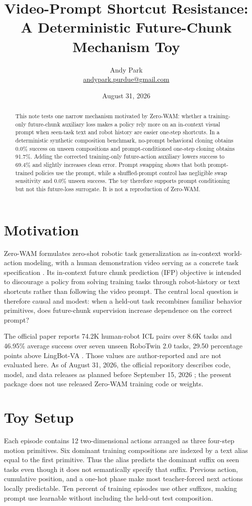 \documentclass[11pt]{article}
\title{Video-Prompt Shortcut Resistance:\\A Deterministic Future-Chunk Mechanism Toy}
\author{Andy Park\\\href{mailto:andypark.purdue@gmail.com}{andypark.purdue@gmail.com}}
\date{August 31, 2026}
\begin{document}
\setlength{\emergencystretch}{3em}
\maketitle

\begin{abstract}
This note tests one narrow mechanism motivated by Zero-WAM: whether a training-only future-chunk auxiliary loss makes a policy rely more on an in-context visual prompt when seen-task text and robot history are easier one-step shortcuts. In a deterministic synthetic composition benchmark, no-prompt behavioral cloning obtains 0.0\% success on unseen compositions and prompt-conditioned one-step cloning obtains 91.7\%. Adding the corrected training-only future-action auxiliary lowers success to 69.4\% and slightly increases clean error. Prompt swapping shows that both prompt-trained policies use the prompt, while a shuffled-prompt control has negligible swap sensitivity and 0.0\% unseen success. The toy therefore supports prompt conditioning but not this future-loss surrogate. It is not a reproduction of Zero-WAM.
\end{abstract}

\section{Motivation}
Zero-WAM formulates zero-shot robotic task generalization as in-context world-action modeling, with a human demonstration video serving as a concrete task specification \cite{primary,project}. Its in-context future chunk prediction (IFP) objective is intended to discourage a policy from solving training tasks through robot-history or text shortcuts rather than following the video prompt. The central local question is therefore causal and modest: when a held-out task recombines familiar behavior primitives, does future-chunk supervision increase dependence on the correct prompt?

The official paper reports 74.2K human-robot ICL pairs over 8.6K tasks and 46.95\% average success over seven unseen RoboTwin 2.0 tasks, 29.50 percentage points above LingBot-VA \cite{primary,project}. Those values are author-reported and are not evaluated here. As of August 31, 2026, the official repository describes code, model, and data releases as planned before September 15, 2026 \cite{code}; the present package does not use released Zero-WAM training code or weights.

\section{Toy Setup}
Each episode contains 12 two-dimensional actions arranged as three four-step motion primitives. Six dominant training compositions are indexed by a text alias equal to the first primitive. Thus the alias predicts the dominant suffix on seen tasks even though it does not semantically specify that suffix. Previous action, cumulative position, and a one-hot phase make most teacher-forced next actions locally predictable. Ten percent of training episodes use other suffixes, making prompt use learnable without including the held-out test composition.
\end{document}
